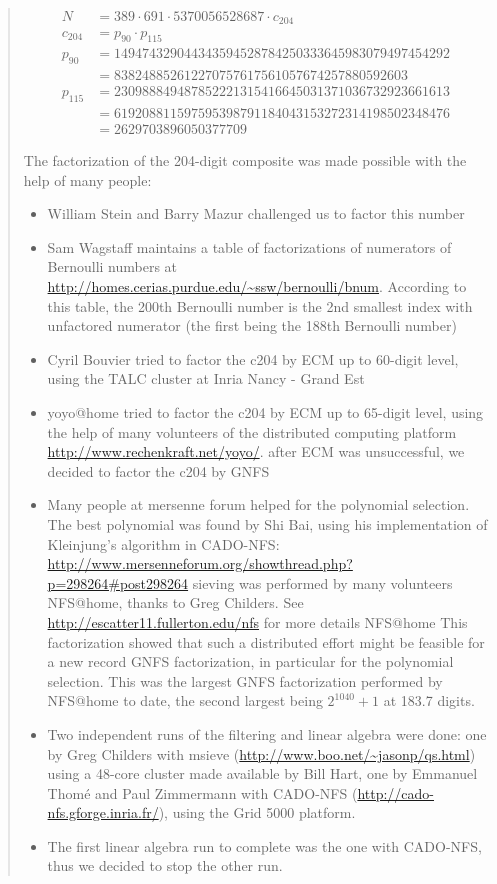 \documentclass[openany]{book}
\theoremstyle{plain}
\theoremstyle{definition}
\begin{document}
{\begin{quote}
\begin{align*}
N &= 389 \cdot 691 \cdot 5370056528687 \cdot c_{204}\\
c_{204} &= p_{90} \cdot p_{115}\\
p_{90}  &= 149474329044343594528784250333645983079497454292\\
        &= 838248852612270757617561057674257880592603\\
p_{115} &= 230988849487852221315416645031371036732923661613\\
        &= 619208811597595398791184043153272314198502348476\\
        &= 2629703896050377709
\end{align*}

The factorization of the 204-digit composite was made possible with the help
of many people:
\begin{itemize}
\item William Stein and Barry Mazur challenged us to factor this number
\item Sam Wagstaff maintains a table of factorizations of numerators of Bernoulli
  numbers at \url{http://homes.cerias.purdue.edu/~ssw/bernoulli/bnum}. According
  to this table, the 200th Bernoulli number is the 2nd smallest index with
  unfactored numerator (the first being the 188th Bernoulli number)
\item Cyril Bouvier tried to factor the c204 by ECM up to 60-digit level, using
  the TALC cluster at Inria Nancy - Grand Est
\item {\sf yoyo@home} tried to factor the c204 by ECM up to 65-digit level, using the
  help of many volunteers of the distributed computing platform
  \url{http://www.rechenkraft.net/yoyo/}.
 after ECM was unsuccessful, we decided to factor the c204 by GNFS
\item Many people at mersenne forum helped for the polynomial selection. The best
  polynomial was found by Shi Bai, using his implementation of Kleinjung's
  algorithm in CADO-NFS:
  \url{http://www.mersenneforum.org/showthread.php?p=298264#post298264}
 sieving was performed by many volunteers {\sf NFS@home}, thanks to Greg
  Childers. See \url{http://escatter11.fullerton.edu/nfs} for more details {\sf NFS@home}
  This factorization showed that such a distributed effort might be feasible for a
  new record GNFS factorization, in particular for the polynomial selection.
  This was the largest GNFS factorization performed by {\sf NFS@home} to date,
  the second largest being $2^{1040}+1$ at 183.7 digits.
\item Two independent runs of the filtering and linear algebra were done: one by Greg
  Childers with msieve (\url{http://www.boo.net/~jasonp/qs.html}) using a 48-core
  cluster made available by Bill Hart, one by Emmanuel Thomé and Paul
  Zimmermann with CADO-NFS (\url{http://cado-nfs.gforge.inria.fr/}), using the Grid
  5000 platform.
\item The first linear algebra run to complete was the one with CADO-NFS, thus we
  decided to stop the other run.
\end{itemize}


\end{quote}}
\end{document}
